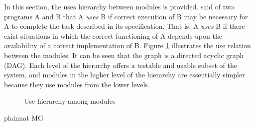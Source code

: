 \documentclass[12pt, titlepage]{article}
\begin{document}
In this section, the uses hierarchy between modules is
provided. \citet{Parnas1978} said of two programs A and B that A {\em uses} B if
correct execution of B may be necessary for A to complete the task described in
its specification. That is, A {\em uses} B if there exist situations in which
the correct functioning of A depends upon the availability of a correct
implementation of B.  Figure \ref{FigUH} illustrates the use relation between
the modules. It can be seen that the graph is a directed acyclic graph
(DAG). Each level of the hierarchy offers a testable and usable subset of the
system, and modules in the higher level of the hierarchy are essentially simpler
because they use modules from the lower levels.

\begin{figure}[H]
\centering
\caption{Use hierarchy among modules}
\label{FigUH}
\end{figure}


 {plainnat}
 {MG}
\end{document}
